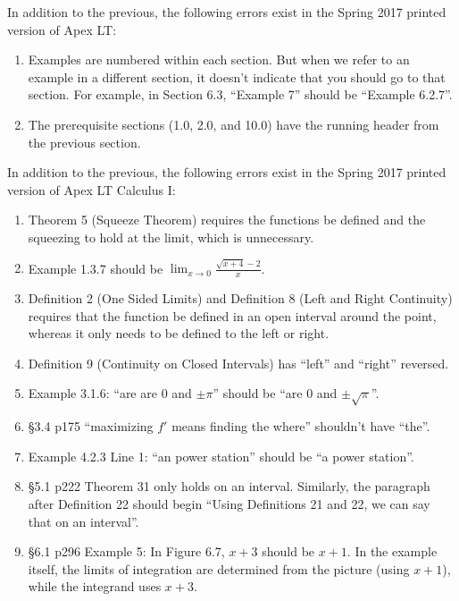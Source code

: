 \documentclass{amsart}
\newcommand{\ds}{\displaystyle}
\begin{document}
\clearpage

\newcommand{\springerrors}{%
In addition to the previous, the following errors exist in the Spring 2017 printed version of Apex LT:
\begin{enumerate}
\item Examples are numbered within each section.  But when we refer to an example in a different section, it doesn't indicate that you should go to that section.  For example, in Section 6.3, ``Example 7'' should be ``Example 6.2.7''.
\item The prerequisite sections (1.0, 2.0, and 10.0) have the running header from the previous section.
\end{enumerate}} %

\springerrors

In addition to the previous, the following errors exist in the Spring 2017 printed version of Apex LT Calculus I:
\begin{enumerate}
\item Theorem 5 (Squeeze Theorem) requires the functions be defined and the squeezing to hold at the limit, which is unnecessary.\vspace{-.5\baselineskip}
\item Example 1.3.7 should be $\ds \lim_{x\to 0} \frac{\sqrt{x+4}-2}{x}$.
\item Definition 2 (One Sided Limits) and Definition 8 (Left and Right Continuity) requires that the function be defined in an open interval around the point, whereas it only needs to be defined to the left or right.
\item Definition 9 (Continuity on Closed Intervals) has ``left'' and ``right'' reversed.
\item Example 3.1.6: ``are are $0$ and $\pm\pi$'' should be ``are $0$ and $\pm\sqrt\pi$''.
\item \S3.4 p175 ``maximizing $f'$ means finding the where'' shouldn't have ``the''.
\item Example 4.2.3 Line 1: ``an power station'' should be ``a power station''.
\item \S5.1 p222 Theorem 31 only holds on an interval.  Similarly, the paragraph after Definition 22 should begin ``Using Definitions 21 and 22, we can say that on an interval''.
\item \S6.1 p296 Example 5: In Figure 6.7, $x+3$ should be $x+1$.  In the example itself, the limits of integration are determined from the picture (using $x+1$), while the integrand uses $x+3$.
\label{2017-01-00Iplus}
\end{enumerate}
\end{document}
